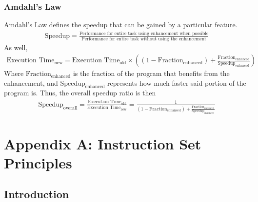 \documentclass[11pt, a4paper]{article}
\theoremstyle{definition}
\theoremstyle{remark}
\newcommand{\app}[2]{%
  \renewcommand{\thesection}{\Alph{section}}%
  \renewcommand{\theHsection}{app.\Alph{section}}%
  \setcounter{section}{#1}\addtocounter{section}{-1}%
  \section{#2}}
\begin{document}
\subsubsection{Amdahl's Law}
Amdahl's Law defines the speedup that can be gained by a particular feature.
\begin{align*}
    \text{Speedup} = \frac{\text{Performance for entire task using enhancement when possible}}{\text{Performance for entire task without using the enhancement}}
\end{align*}
As well,
\begin{align*}
    \text{Execution Time}_\text{new} = \text{Execution Time}_\text{old}\times ((1-\text{Fraction}_\text{enhanced})+\frac{\text{Fraction}_\text{enhanced}}{\text{Speedup}_\text{enhanced}})
\end{align*}
Where $\text{Fraction}_\text{enhanced}$ is the fraction of the program that benefits from the enhancement, and $\text{Speedup}_\text{enhanced}$ represents how much faster said portion of the program is. Thus, the overall speedup ratio is then
\begin{align*}
    \text{Speedup}_\text{overall} = \frac{\text{Execution Time}_\text{old}}{\text{Execution Time}_\text{new}}=\frac{1}{(1-\text{Fraction}_\text{enhanced})+\frac{\text{Fraction}_\text{enhanced}}{\text{Speedup}_\text{enhanced}}}
\end{align*}
\newpage
\app{1}{Appendix A: Instruction Set Principles}
\subsection{Introduction}
\end{document}
